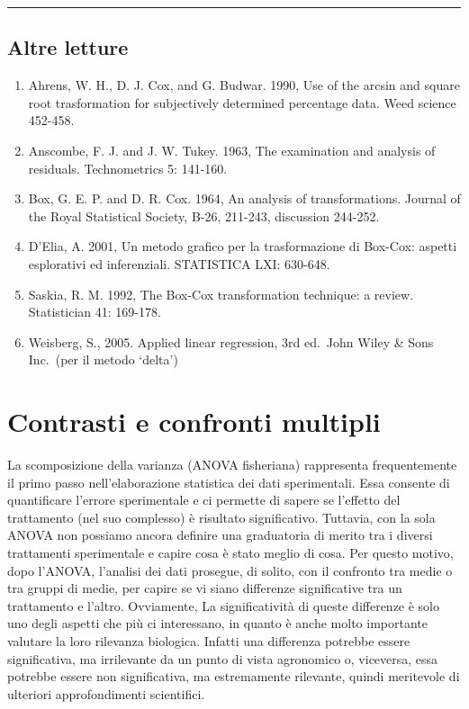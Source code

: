 \documentclass[a4paper,12pt,oneside]{book}
\providecommand{\tightlist}{%
  \setlength{\itemsep}{0pt}\setlength{\parskip}{0pt}}
\begin{document}
\begin{center}\rule{0.5\linewidth}{0.5pt}\end{center}

\hypertarget{altre-letture-7}{%
\section{Altre letture}\label{altre-letture-7}}

\begin{enumerate}
\def\labelenumi{\arabic{enumi}.}
\tightlist
\item
  Ahrens, W. H., D. J. Cox, and G. Budwar. 1990, Use of the arcsin and square root trasformation for subjectively determined percentage data. Weed science 452-458.
\item
  Anscombe, F. J. and J. W. Tukey. 1963, The examination and analysis of residuals. Technometrics 5: 141-160.
\item
  Box, G. E. P. and D. R. Cox. 1964, An analysis of transformations. Journal of the Royal Statistical Society, B-26, 211-243, discussion 244-252.
\item
  D'Elia, A. 2001, Un metodo grafico per la trasformazione di Box-Cox: aspetti esplorativi ed inferenziali. STATISTICA LXI: 630-648.
\item
  Saskia, R. M. 1992, The Box-Cox transformation technique: a review. Statistician 41: 169-178.
\item
  Weisberg, S., 2005. Applied linear regression, 3rd ed.~John Wiley \& Sons Inc.~(per il metodo `delta')
\end{enumerate}

\hypertarget{contrasti-e-confronti-multipli}{%
\chapter{Contrasti e confronti multipli}\label{contrasti-e-confronti-multipli}}

La scomposizione della varianza (ANOVA fisheriana) rappresenta frequentemente il primo passo nell'elaborazione statistica dei dati sperimentali. Essa consente di quantificare l'errore sperimentale e ci permette di sapere se l'effetto del trattamento (nel suo complesso) è risultato significativo. Tuttavia, con la sola ANOVA non possiamo ancora definire una graduatoria di merito tra i diversi trattamenti sperimentale e capire cosa è stato meglio di cosa. Per questo motivo, dopo l'ANOVA, l'analisi dei dati prosegue, di solito, con il confronto tra medie o tra gruppi di medie, per capire se vi siano differenze significative tra un trattamento e l'altro. Ovviamente, La significatività di queste differenze è solo uno degli aspetti che più ci interessano, in quanto è anche molto importante valutare la loro rilevanza biologica. Infatti una differenza potrebbe essere significativa, ma irrilevante da un punto di vista agronomico o, viceversa, essa potrebbe essere non significativa, ma estremamente rilevante, quindi meritevole di ulteriori approfondimenti scientifici.
\end{document}
